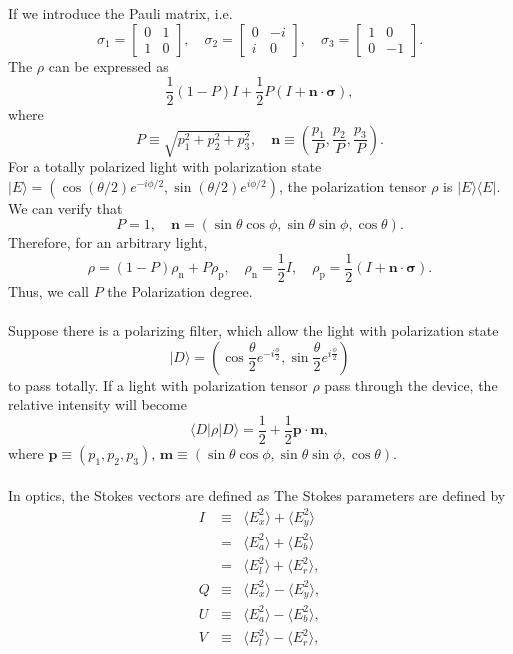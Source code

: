 If we introduce the Pauli matrix, i.e.
\[\sigma_1 = \left[ \begin{matrix} 0& 1\\ 1& 0\end{matrix} \right] , \quad \sigma_2 = \left[ \begin{matrix} 0& - i\\ i& 0\end{matrix} \right] , \quad \sigma_3 = \left[ \begin{matrix} 1& 0\\ 0& -1\end{matrix} \right] .\]
The $\rho$ can be expressed as
\[\frac{1}{2} (1-P) I + \frac{1}{2} P(I + \bm{n} \cdot \bm{\sigma}),\]
where
\[P \equiv \sqrt{p_1^2 + p_2^2 + p_3^2} , \quad \bm{n} \equiv (\frac{p_1}{P},\frac{p_2}{P},\frac{p_3}{P}).\]
For a totally polarized light with polarization state$ | E\rangle = (\cos ({\theta}/{2}) e^{-i{\phi}/{2}} , \sin ({\theta}/{2}) e^{i{\phi}/{2}})$, the polarization tensor $\rho$ is $|E\rangle \langle E|$. We can verify that
\[P = 1 , \quad \bm{n} = (\sin\theta \cos\phi, \sin\theta \sin\phi, \cos \theta).\]
Therefore, for an arbitrary light,
\[\rho = (1-P)\rho_{\mathrm{n}} + P \rho_{\mathrm{p}} , \quad \rho_{\mathrm{n}} = \frac{1}{2}I , \quad \rho_{\mathrm{p}} = \frac{1}{2}(I + \bm{n} \cdot \bm{\sigma}).\]
Thus, we call $P$ the Polarization degree. \\ \\
Suppose there is a polarizing filter,  which allow the light with polarization state
\[| D \rangle = (\cos \frac{\theta}{2} e^{-i\frac{\phi}{2}} , \sin \frac{\theta}{2} e^{i\frac{\phi}{2}})\]
to pass totally. If a light with polarization tensor $\rho$ pass through the device, the relative intensity will become
\[\langle D | \rho | D \rangle = \frac{1}{2} + \frac{1}{2} \bm{p} \cdot \bm{m},\]
where $\bm{p} \equiv (p_1,p_2,p_3)$, $\bm{m} \equiv (\sin\theta \cos\phi, \sin\theta \sin\phi, \cos \theta)$.
\\ \\
In optics, the Stokes vectors are defined as
The Stokes parameters are defined by
\begin{eqnarray}
I&\equiv& \langle E_{x}^{2}\rangle +\langle E_{y}^{2}\rangle \nonumber \\
&=& \langle E_{a}^{2}\rangle +\langle E_{b}^{2}\rangle \nonumber \\
&=& \langle E_{l}^{2}\rangle +\langle E_{r}^{2}\rangle, \nonumber \\
Q&\equiv& \langle E_{x}^{2}\rangle -\langle E_{y}^{2}\rangle, \nonumber \\
U&\equiv& \langle E_{a}^{2}\rangle -\langle E_{b}^{2}\rangle, \nonumber \\
V&\equiv& \langle E_{l}^{2}\rangle -\langle E_{r}^{2}\rangle, \nonumber
\end{eqnarray}
